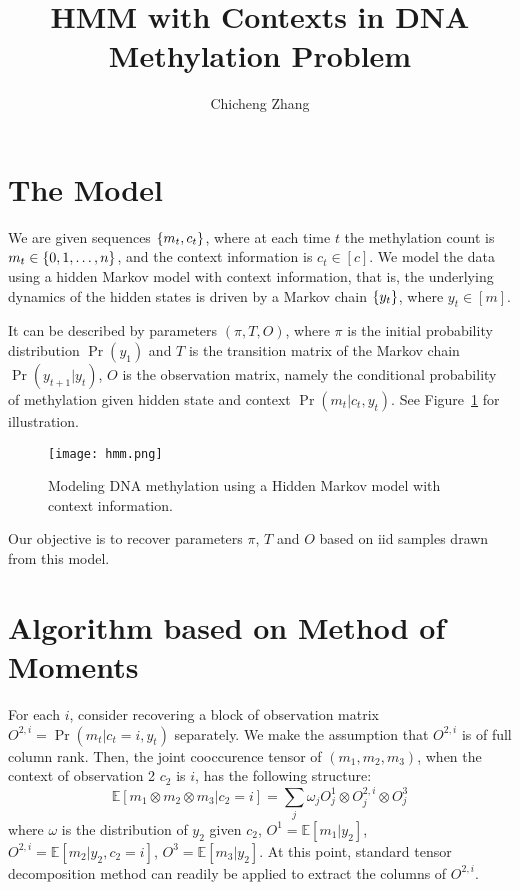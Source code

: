 \documentclass{article}
\title{HMM with Contexts in DNA Methylation Problem}
\author{Chicheng Zhang}
\def\E{\mathbb{E}}
\begin{document}
\maketitle


\section{The Model}

We are given sequences $\cbr{m_t, c_t}$, where at each time $t$ the methylation count is $m_t \in \cbr{0,1,\ldots,n}$, and the context information is $c_t \in [c]$. We model the data using a hidden Markov model with context information, that is, the underlying dynamics of the hidden states is driven by a Markov chain $\cbr{y_t}$, where $y_t \in [m]$.

It can be described by parameters $(\pi, T, O)$, where $\pi$ is the initial probability distribution $\Pr(y_1)$ and $T$ is the transition matrix of the Markov chain $\Pr(y_{t+1} | y_t)$, $O$ is the observation matrix, namely the conditional probability of methylation given hidden state and context $\Pr(m_t | c_t, y_t)$. See Figure~\ref{fig:contexthmm} for illustration.

\begin{figure}[h]
\centering
\scalebox{0.3}
{
\texttt{[image: hmm.png]}
}
\caption{Modeling DNA methylation using a Hidden Markov model with context information.}
\label{fig:contexthmm}
\end{figure}

Our objective is to recover parameters $\pi$, $T$ and $O$ based on iid samples drawn from this model.

\section{Algorithm based on Method of Moments}

For each $i$, consider recovering a block of observation matrix $O^{2, i} = \Pr(m_t | c_t = i, y_t)$ separately. We make the assumption that $O^{2, i}$ is of full column rank. Then, the joint cooccurence tensor of $(m_1, m_2, m_3)$, when the context of observation 2 $c_2$ is $i$, has the following structure:
\[ \E [m_1 \otimes m_2 \otimes m_3 | c_2 = i] = \sum_j \omega_j O^{1}_j \otimes O^{2, i}_j \otimes O^{3}_j \]
where $\omega$ is the distribution of $y_2$ given $c_2$, $O^{1} = \E[m_1 | y_2]$, $O^{2,i} = \E[m_2 | y_2, c_2 = i]$, $O^{3} = \E[m_3 | y_2]$.
At this point, standard tensor decomposition method can readily be applied to extract the columns of $O^{2, i}$.
\end{document}
